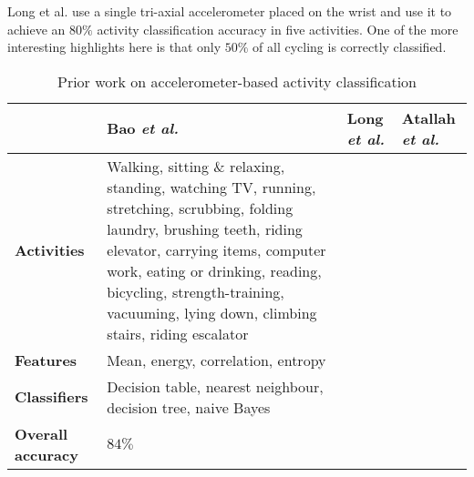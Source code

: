     Long et al. \cite{long2009single} use a single tri-axial accelerometer placed on the wrist and 
    use it to achieve an $80\%$ activity classification accuracy in five activities.  One of the
    more interesting highlights here is that only $50\%$ of all cycling is correctly
    classified.
    \begin{table}[p]
      \begin{tabu} to 
        \hline
          & \textbf{Bao \emph{et al.} \cite{bao2004activity}}
          & \textbf{Long \emph{et al.} \cite{long2009single}}
          & \textbf{Atallah \emph{et al.} \cite{atallah2010sensor}} \\
        \hline
          \textbf{Activities}
          & Walking, \newline sitting \& relaxing, \newline standing, \newline watching TV, \newline running, \newline stretching, \newline scrubbing, \newline
          folding laundry, \newline brushing teeth, \newline riding elevator, \newline carrying items, \newline
          computer work, \newline eating or drinking, \newline reading, \newline bicycling, \newline strength-training, \newline
          vacuuming, \newline lying down, \newline climbing stairs, \newline riding escalator
          & & \\
        \hline
          \textbf{Features}
          & Mean, energy, correlation, entropy & & \\
        \hline
          \textbf{Classifiers}
          & Decision table, nearest neighbour, decision tree, naive Bayes
          & & \\
        \hline
          \textbf{Overall accuracy}
          & $84\%$ & & \\
        \hline
      \end{tabu}
        \caption{Prior work on accelerometer-based activity classification}
        \label{tab:intro-relatedwork-comparison}
    \end{table}
      
    
    
